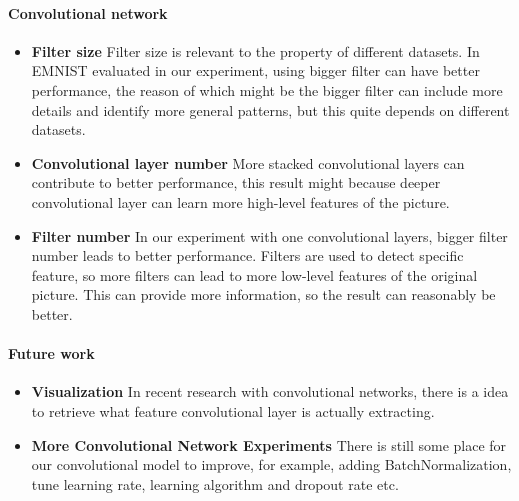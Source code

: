 \documentclass{article}
\begin{document}
\paragraph{Convolutional network}
\begin{itemize}
	\item \textbf{Filter size} Filter size is relevant to the property of different datasets. In EMNIST evaluated in our experiment, using bigger filter can have better performance, the reason of which might be the bigger filter can include more details and identify more general patterns, but this quite depends on different datasets.
	\item \textbf{Convolutional layer number} More stacked convolutional layers can contribute to better performance, this result might because deeper convolutional layer can learn more high-level features of the picture.
	\item \textbf{Filter number} In our experiment with one convolutional layers, bigger filter number leads to better performance. Filters are used to detect specific feature, so more filters can lead to more low-level features of the original picture. This can provide more information, so the result can reasonably be better.
\end{itemize}
 
\paragraph{Future work} 
\begin{itemize}
	\item \textbf{Visualization} In recent research with convolutional networks, there is a idea to retrieve what feature convolutional layer is actually extracting.
	\item \textbf{More Convolutional Network Experiments} There is still some place for our convolutional model to improve, for example, adding BatchNormalization, tune learning rate, learning algorithm and dropout rate etc.
\end{itemize}




\end{document}
